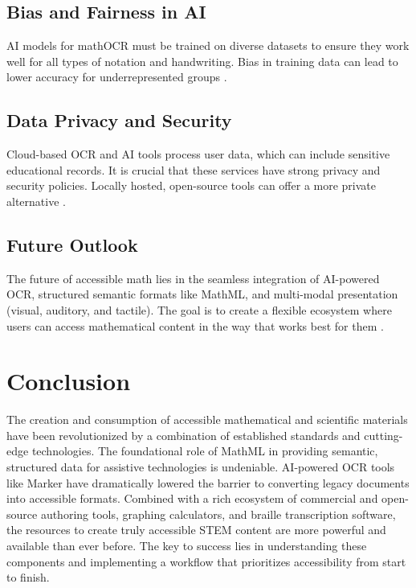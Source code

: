\subsection{Bias and Fairness in AI}\label{ch11:ssec:bias}
\gls{AI} models for \gls{mathOCR} must be trained on diverse datasets to ensure they work well for all types of notation and handwriting. Bias in training data can lead to lower accuracy for underrepresented groups \supercite{AIEthicsBias, BiasinAI}.

\subsection{Data Privacy and Security}\label{ch11:ssec:privacy}
Cloud-based \gls{OCR} and \gls{AI} tools process user data, which can include sensitive educational records. It is crucial that these services have strong privacy and security policies. Locally hosted, open-source tools can offer a more private alternative \supercite{DataPrivacyAI}.

\subsection{Future Outlook}\label{ch11:ssec:future}
The future of accessible math lies in the seamless integration of \gls{AI}-powered \gls{OCR}, structured semantic formats like \gls{MathML}, and multi-modal presentation (visual, auditory, and tactile). The goal is to create a flexible ecosystem where users can access mathematical content in the way that works best for them \supercite{Kim2023, W3CEmergingTechA11y}.

\section{Conclusion}\label{ch11:sec:conclusion}
The creation and consumption of accessible mathematical and scientific materials have been revolutionized by a combination of established standards and cutting-edge technologies. The foundational role of \gls{MathML} in providing semantic, structured data for assistive technologies is undeniable. \gls{AI}-powered \gls{OCR} tools like Marker have dramatically lowered the barrier to converting legacy documents into accessible formats. Combined with a rich ecosystem of commercial and open-source authoring tools, graphing calculators, and braille transcription software, the resources to create truly accessible STEM content are more powerful and available than ever before. The key to success lies in understanding these components and implementing a workflow that prioritizes accessibility from start to finish.
